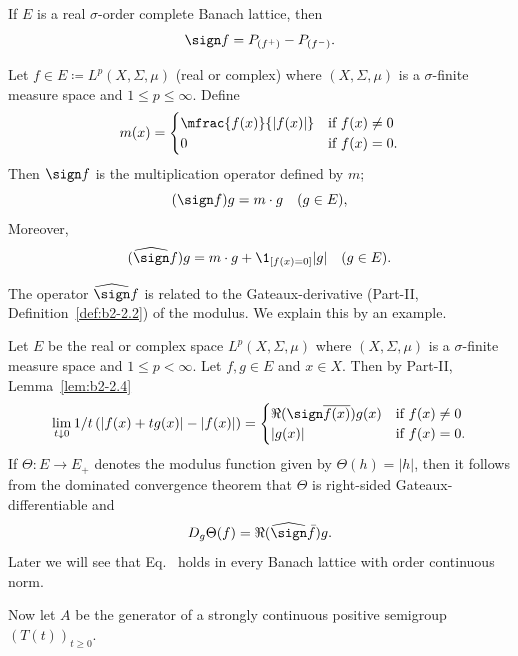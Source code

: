 If\/ $E$ is a real $\sigma$-order complete Banach lattice, then
\begin{equation}\label{eq:c2-2.5}
	\sign f = P_{(f^{+})} - P_{(f^{-})}.
\end{equation}
\begin{example}\label{ex:c2-2.2}
%
Let $f \in E \coloneqq L^p(X,\Sigma,\mu)$ (real or complex) where $(X,\Sigma,\mu)$ is a $\sigma$-finite measure space and $1 \leq p \leq \infty$.
Define  
\begin{align*}
	m(x) = 
	\begin{cases}
    	\mfrac{f(x)}{ \lvert f(x) \rvert} & \text{if }  f(x)   \neq 0 \\  
    	0 & \text{if } f(x) = 0.
	\end{cases}
\end{align*}
Then $\sign f$ is the multiplication operator defined by $m$; \ie
\[
	(\sign f)g = m \cdot g \quad (g \in E), 
\]
Moreover, 
\[
	(\widehat{\sign} f)g = m \cdot g + \1_{[f(x)=0]}|g| \quad (g \in E).
\]
\end{example}
The operator $\widehat{\sign} f$ is related to the Gateaux-derivative (Part-II, Definition~\ref{def:b2-2.2}) of the modulus.
We explain this by an example.
\begin{example}\label{ex:c2-2.3}
%
Let $E$ be the real or complex space $L^p(X,\Sigma,\mu)$ where $(X,\Sigma,\mu)$ is a $\sigma$-finite measure space and $1 \leq p < \infty$.
Let $f,g \in E$ and $x \in X$.
Then by Part-II, Lemma~\ref{lem:b2-2.4}
\begin{align*}
\lim_{t \downarrow 0} 1/t\, (|f(x)+tg(x)|-|f(x)|) = 
\begin{cases}
    \Re (\sign \overline{f(x)})g(x) & \text{if } f(x) \neq 0 \\
    |g(x)| & \text{if } f(x) = 0.
\end{cases}
\end{align*}
If\/ $\Theta \colon E \to E_{+}$ denotes the modulus function given by $\Theta(h) = |h|$, then it follows from the dominated convergence theorem that $\Theta$ is right-sided Gateaux-differentiable and
\begin{equation}\label{eq:c2-2.6}
D_{g}\Theta(f) = \Re(\widehat{\sign} \bar{f})g.
\end{equation}
Later we will see that Eq.~   holds in every Banach lattice with order continuous norm.
\end{example}
Now let $A$ be the generator of a strongly continuous positive semigroup $(T(t))_{t \geq 0}$.

